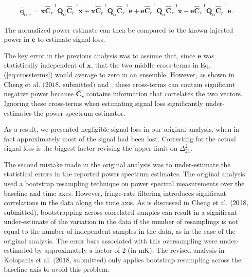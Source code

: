 \documentclass[onecolumn]{emulateapj} \shorttitle{}
\newcommand{\kolopaniscitet}{\textrm{Kolopanis et al. (2018, submitted)}}
\newcommand{\chengcitet}{\textrm{Cheng et al. (2018, submitted)}}
\begin{document}
\begin{align}
\widehat{\textbf{q}}_{\alpha,r} ={\mathbf x}\widehat{\textbf{C}}_r^{-1}\textbf{Q}_\alpha \widehat{\textbf{C}}_r^{-1}{\mathbf x}+
{\mathbf x}\widehat{\textbf{C}}_r^{-1}\textbf{Q}_\alpha \widehat{\textbf{C}}_r^{-1}{\mathbf e}+
{\mathbf e}\widehat{\textbf{C}}_r^{-1}\textbf{Q}_\alpha \widehat{\textbf{C}}_r^{-1}{\mathbf x}+
{\mathbf e}\widehat{\textbf{C}}_r^{-1}\textbf{Q}_\alpha \widehat{\textbf{C}}_r^{-1}{\mathbf e}.
\label{eq:crossterms}
\end{align}

\noindent The normalized power estimate can then be compared to the known injected power in $\mathbf{e}$ to estimate signal loss.

The key error in the previous analysis was to assume that, since $\mathbf e$ was statistically independent of $\mathbf x$, that
the two middle cross-terms in Eq. (\ref{eq:crossterms}) would
average to zero in an ensemble. 
However, as shown in $\chengcitet$ and \citet{switzer_et_al2015}, these cross-terms can contain
significant negative power because $\widehat{\textbf{C}}_r$ contains information
that correlates the two vectors. Ignoring these cross-terms when estimating signal loss significantly under-estimates the power spectrum estimator.

As a result, we presented negligible signal loss in our original analysis, when in fact approximately
most of the signal had been lost. Correcting for the actual signal loss is the biggest factor revising the upper limit
on $\Delta^2_{21}$.

The second mistake made in the original analysis was to under-estimate the statistical errors in the reported power spectrum
estimates.  The original analysis used a bootstrap resampling technique on power spectral measurements over the baseline and time axes.
However, fringe-rate filtering introduces significant correlations in the data
along the time axis.  As is discussed in \chengcitet, bootstrapping across correlated samples can result in a significant under-estimate
of the variation in the data if the number of resamplings is not equal to the number of independent samples in the data, as in the case 
of the original analysis. The error bars associated with this oversampling were under-estimated by approximately a factor of 2 (in $\textrm{mK}$).
The revised analysis in $\kolopaniscitet$ only applies bootstrap resampling across the baseline axis to avoid this problem.
\end{document}
